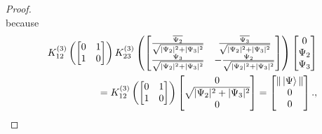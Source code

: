 \documentclass[10pt,a4paper]{amsart}
\begin{document}
\begin{proof}
$$  $$
  because
  \begin{align*}
  K_{12}^{(3)}\left( \begin{bmatrix} 0 & 1 \\ 1 & 0 \end{bmatrix}\right)K_{23}^{(3)}\left(\begin{bmatrix}
    \frac{\overline{\Psi_2}}{\sqrt{ |\Psi_2|^2+|\Psi_3|^2}} & \frac{\overline{\Psi_3}}{\sqrt{ |\Psi_2|^2+|\Psi_3|^2}} \\
    \frac{\Psi_3}{\sqrt{ |\Psi_2|^2+|\Psi_3|^2}} & -\frac{\Psi_2}{\sqrt{ |\Psi_2|^2+|\Psi_3|^2}} \end{bmatrix} \right)\begin{bmatrix} 0 \\ \Psi_2 \\ \Psi_3 \end{bmatrix} \\ 
      = K_{12}^{(3)}\left( \begin{bmatrix} 0 & 1 \\ 1 & 0 \end{bmatrix}\right) \begin{bmatrix} 0\\ \sqrt{ |\Psi_2|^2+|\Psi_3|^2}\\ 0 \end{bmatrix} = \begin{bmatrix} \|\ket{\Psi}\| \\ 0\\ 0 \end{bmatrix}.,
  \end{align*}
  

\end{proof}
\end{document}
